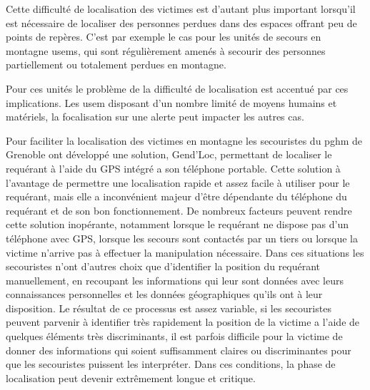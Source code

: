 
Cette difficulté de localisation des victimes est d'autant plus
important lorsqu'il est nécessaire de localiser des personnes perdues
dans des espaces offrant peu de points de repères. C'est par exemple
le cas pour les unités de secours en montagne \acp{usem}, qui sont
régulièrement amenés à secourir des personnes partiellement ou
totalement perdues en montagne.

Pour ces unités le problème de la difficulté de localisation est
accentué par ces implications. Les \ac{usem} disposant d'un nombre
limité de moyens humains et matériels, la focalisation sur une alerte
peut impacter les autres cas.

Pour faciliter la localisation des victimes en montagne les
secouristes du \ac{pghm} de Grenoble ont développé une solution,
Gend'Loc, permettant de localiser le requérant à l'aide du GPS intégré
a son téléphone portable. Cette solution à l'avantage de permettre une
localisation rapide et assez facile à utiliser pour le requérant, mais
elle a inconvénient majeur d'être dépendante du téléphone du requérant
et de son bon fonctionnement. De nombreux facteurs peuvent rendre
cette solution inopérante, notamment lorsque le requérant ne dispose
pas d'un téléphone avec GPS, lorsque les secours sont contactés par un
tiers ou lorsque la victime n'arrive pas à effectuer la manipulation
nécessaire. Dans ces situations les secouristes n'ont d'autres choix
que d'identifier la position du requérant manuellement, en recoupant
les informations qui leur sont données avec leurs connaissances
personnelles et les données géographiques qu'ils ont à leur
disposition. Le résultat de ce processus est assez variable, si les
secouristes peuvent parvenir à identifier très rapidement la position
de la victime a l'aide de quelques éléments très discriminants, il est
parfois difficile pour la victime de donner des informations qui
soient suffisamment claires ou discriminantes pour que les secouristes
puissent les interpréter. Dans ces conditions, la phase de
localisation peut devenir extrêmement longue et critique.

